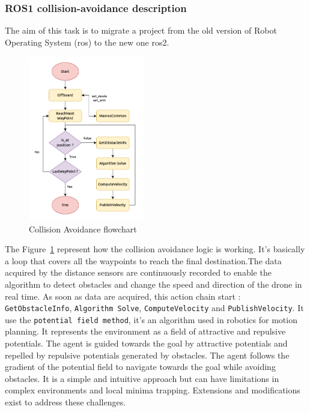 \subsubsection{ ROS1 collision-avoidance description}

The aim of this task is to migrate a project from the old version of Robot Operating System (\gls{ros}) to the new one \gls{ros2}.

\begin{figure}
    \centering
    \includegraphics[width=0.45\textwidth]{./projects/ardupilot/ca_flowchart.png}
    \caption{Collision Avoidance flowchart}
    \label{fig:ca-flowchart}
\end{figure}

\hfill \break
The Figure~\ref{fig:ca-flowchart} represent how the collision avoidance logic is working.
It's basically a loop that covers all the waypoints to reach the final destination.The data acquired by the distance sensors are continuously recorded to enable the algorithm to detect obstacles and change the speed and direction of the drone in real time.
As soon as data are acquired, this action chain start : \texttt{GetObstacleInfo}, \texttt{Algorithm Solve}, \texttt{ComputeVelocity} and \texttt{PublishVelocity}.
\hfill \break
\hfill \break
It use the \texttt{potential field method}\cite{potential_field}, it's an algorithm used in robotics for motion planning. It represents the environment as a field of attractive and repulsive potentials. The agent is guided towards the goal by attractive potentials and repelled by repulsive potentials generated by obstacles. The agent follows the gradient of the potential field to navigate towards the goal while avoiding obstacles.
It is a simple and intuitive approach but can have limitations in complex environments and local minima trapping. Extensions and modifications exist to address these challenges.

